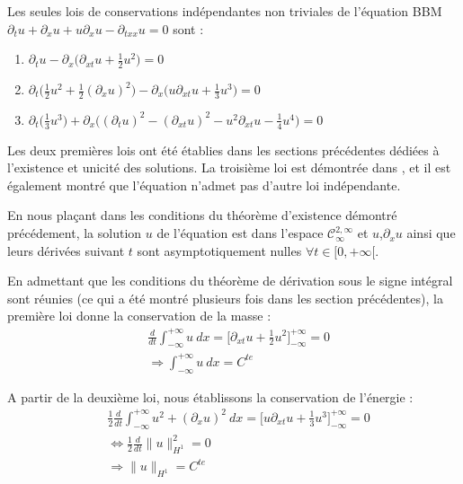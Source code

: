 \begin{theorembox}
\begin{theorem}
    Les seules lois de conservations indépendantes non triviales de l'équation BBM $\partial_tu + \partial_xu +u\partial_xu - \partial_{txx}u = 0$ sont :
    \begin{enumerate}
        \item $\partial_tu - \partial_x \bigg(\partial_{xt}u + \frac{1}{2}u^2\bigg) = 0$
        \item $\partial_t\Big( \frac{1}{2}u^2 + \frac{1}{2}(\partial_xu)^2 \Big) - \partial_x\Big(u\partial_{xt}u + \frac{1}{3}u^3\Big) = 0$
        \item $\partial_t\bigg(\frac{1}{3}u^3\bigg) + \partial_x\bigg( (\partial_tu)^2 - (\partial_{xt}u)^2 - u^2\partial_{xt}u - \frac{1}{4}u^4 \bigg) = 0$
    \end{enumerate}
\end{theorem}
\end{theorembox}

Les deux premières lois ont été établies dans les sections précédentes dédiées à l'existence et unicité des solutions. 
La troisième loi est démontrée dans \cite{conservation}, et il est également montré que l'équation n'admet pas d'autre loi indépendante. 

\vspace{1em}

En nous plaçant dans les conditions du théorème d'existence démontré précédement, la solution $u$ de l'équation est dans l'espace $\mathcal{C}^{2,\infty}_{\infty}$ et $u$,$\partial_xu$ ainsi que leurs dérivées suivant $t$ sont asymptotiquement nulles $\forall t \in [0,+\infty[$.

En admettant que les conditions du théorème de dérivation sous le signe intégral sont réunies (ce qui a été montré plusieurs fois dans les section précédentes), la première loi donne la conservation de la masse :
\begin{equation*}
\begin{split}
    &\frac{d}{dt}\int_{-\infty}^{+\infty} u \ dx = \bigg[ \partial_{xt}u + \frac{1}{2}u^2 \bigg]_{-\infty}^{+\infty} = 0 \\
    &\Rightarrow \int_{-\infty}^{+\infty} u \ dx = C^{te}
\end{split}
\end{equation*}

A partir de la deuxième loi, nous établissons la conservation de l'énergie :
\begin{equation*}
\begin{split}
    &\frac{1}{2} \frac{d}{dt} \int_{-\infty}^{+\infty} u^2 + (\partial_xu)^2 \ dx = \bigg[ u\partial_{xt}u + \frac{1}{3}u^3 \bigg]_{-\infty}^{+\infty} = 0 \\
    &\Leftrightarrow \frac{1}{2}\frac{d}{dt} \| u \|_{H^1}^2 = 0 \\
    &\Rightarrow \| u \|_{H^1} = C^{te}
\end{split}
\end{equation*}

